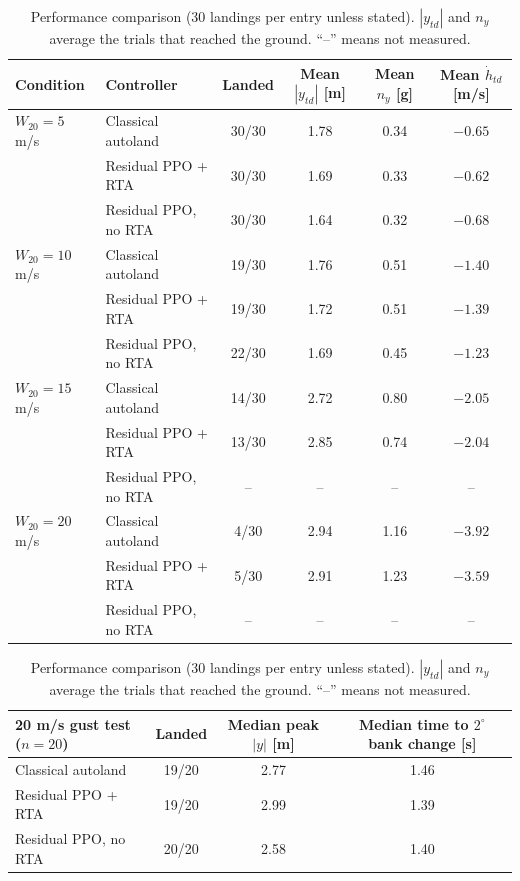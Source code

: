 \documentclass[10pt,a4paper]{article}
\begin{document}
\begin{table}[H]
\centering
\caption{Performance comparison (30 landings per entry unless stated). \(|y_{td}|\) and \(n_y\) average the trials that reached the ground. ``--'' means not measured.}
\label{tab:compare}
\small
\begin{tabular}{@{}llcccc@{}}
\toprule
Condition & Controller & Landed & Mean \(|y_{td}|\) [m] & Mean \(n_y\) [g] & Mean \(\dot{h}_{td}\) [m/s]\\
\midrule
\(W_{20}=5\) m/s & Classical autoland & 30/30 & 1.78 & 0.34 & \(-0.65\)\\
 & Residual PPO + RTA & 30/30 & 1.69 & 0.33 & \(-0.62\)\\
 & Residual PPO, no RTA & 30/30 & 1.64 & 0.32 & \(-0.68\)\\
\midrule
\(W_{20}=10\) m/s & Classical autoland & 19/30 & 1.76 & 0.51 & \(-1.40\)\\
 & Residual PPO + RTA & 19/30 & 1.72 & 0.51 & \(-1.39\)\\
 & Residual PPO, no RTA & 22/30 & 1.69 & 0.45 & \(-1.23\)\\
\midrule
\(W_{20}=15\) m/s & Classical autoland & 14/30 & 2.72 & 0.80 & \(-2.05\)\\
 & Residual PPO + RTA & 13/30 & 2.85 & 0.74 & \(-2.04\)\\
 & Residual PPO, no RTA & -- & -- & -- & --\\
\midrule
\(W_{20}=20\) m/s & Classical autoland & 4/30 & 2.94 & 1.16 & \(-3.92\)\\
 & Residual PPO + RTA & 5/30 & 2.91 & 1.23 & \(-3.59\)\\
 & Residual PPO, no RTA & -- & -- & -- & --\\
\bottomrule
\end{tabular}

\vspace{0.5em}
\begin{tabular}{@{}lccc@{}}
\toprule
20 m/s gust test (\(n=20\)) & Landed & Median peak \(|y|\) [m] & Median time to \(2^\circ\) bank change [s]\\
\midrule
Classical autoland & 19/20 & 2.77 & 1.46\\
Residual PPO + RTA & 19/20 & 2.99 & 1.39\\
Residual PPO, no RTA & 20/20 & 2.58 & 1.40\\
\bottomrule
\end{tabular}
\end{table}
\end{document}
